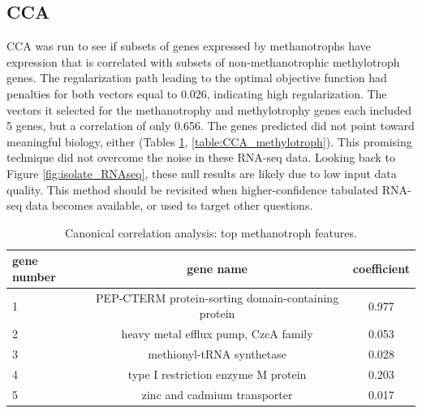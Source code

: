 

\subsection{CCA}

CCA was run to see if subsets of genes expressed by methanotrophs have expression that is correlated with subsets of non-methanotrophic methylotroph genes.
The regularization path leading to the optimal objective function had penalties for both vectors equal to 0.026, indicating high regularization.
The vectors it selected for the methanotrophy and methylotrophy genes each included 5 genes, but a correlation of only 0.656.
The genes predicted did not point toward meaningful biology, either (Tables \ref{table:CCA_methanotroph}, \ref{table:CCA_methylotroph}).
This promising technique did not overcome the noise in these RNA-seq data.
Looking back to Figure \ref{fig:isolate_RNAseq}, these null results are likely due to low input data quality.
This method should be revisited when higher-confidence tabulated RNA-seq data becomes available, or used to target other questions.

\begin{table}[H]
\centering
\begin{singlespace}
\caption[Canonical correlation analysis: top features]{Canonical correlation analysis: top methanotroph features.}
\begin{tabular}{l | c | c}
          gene number & gene name & coefficient  \\
\midrule
	1 & PEP-CTERM protein-sorting domain-containing  protein & 0.977  \\
	2 & heavy metal efflux pump, CzcA family &  0.053  \\
	3 & methionyl-tRNA synthetase &  0.028 \\
	4 & type I restriction enzyme M protein &  0.203 \\
	5 & zinc and cadmium transporter &  0.017 \\
\end{tabular}
\label{table:CCA_methanotroph}
\end{singlespace}
\end{table}

